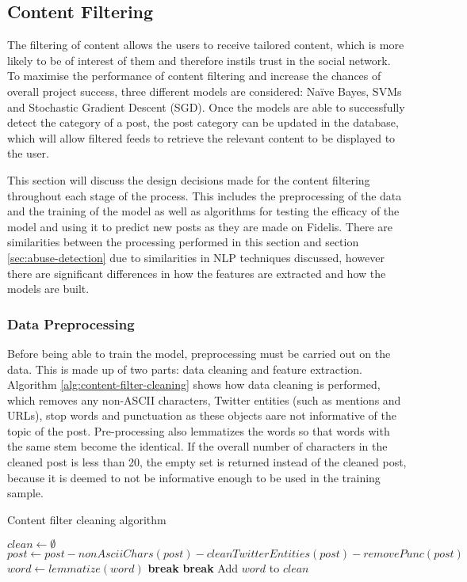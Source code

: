 \subsection{Content Filtering}
The filtering of content allows the users to receive tailored content, which is more likely to be of interest of them and therefore instils trust in the social network. To maximise the performance of content filtering and increase the chances of overall project success, three different models are considered: Na\"ive Bayes, SVMs and Stochastic Gradient Descent (SGD). Once the models are able to successfully detect the category of a post, the post category can be updated in the database, which will allow filtered feeds to retrieve the relevant content to be displayed to the user. 

This section will discuss the design decisions made for the content filtering throughout each stage of the process. This includes the preprocessing of the data and the training of the model as well as algorithms for testing the efficacy of the model and using it to predict new posts as they are made on Fidelis. There are similarities between the processing performed in this section and section \ref{sec:abuse-detection} due to similarities in NLP techniques discussed, however there are significant differences in how the features are extracted and how the models are built.

\subsubsection{Data Preprocessing}
Before being able to train the model, preprocessing must be carried out on the data. This is made up of two parts: data cleaning and feature extraction. Algorithm \ref{alg:content-filter-cleaning} shows how data cleaning is performed, which removes any non-ASCII characters, Twitter entities (such as mentions and URLs), stop words and punctuation as these objects aare not informative of the topic of the post. Pre-processing also lemmatizes the words so that words with the same stem become the identical. If the overall number of characters in the cleaned post is less than 20, the empty set is returned instead of the cleaned post, because it is deemed to not be informative enough to be used in the training sample.

\begin{algorithm}[H]
\caption{Content filter cleaning algorithm}
\label{alg:content-filter-cleaning}
\begin{algorithmic}[1]
	\State $clean\gets \emptyset$
	\State $post\gets post - nonAsciiChars(post) - cleanTwitterEntities(post)- removePunc(post)$
		\State $word\gets lemmatize(word)$
			\State \textbf{break} 
		\EndIf
			\State \textbf{break} 
		\EndIf
		\State Add $word$ to $clean$
	\EndFor
		\State \Return{$\emptyset$}
	\Else
		\State {}
	\EndIf
\EndFunction
\end{algorithmic}
\end{algorithm}

